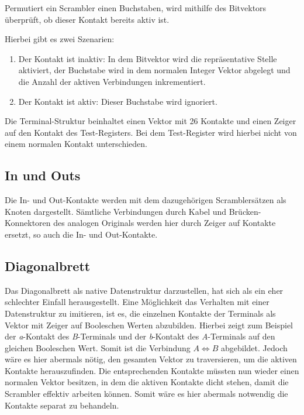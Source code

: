 \noindent


Permutiert ein Scrambler einen Buchstaben, wird mithilfe des Bitvektors überprüft, ob dieser Kontakt bereits aktiv ist.

Hierbei gibt es zwei Szenarien:
\begin{enumerate}
	\item Der Kontakt ist inaktiv: In dem Bitvektor wird die repräsentative Stelle aktiviert, der Buchstabe wird in dem normalen Integer Vektor abgelegt und die Anzahl der aktiven Verbindungen inkrementiert.
	
	\item Der Kontakt ist aktiv: Dieser Buchstabe wird ignoriert. 
\end{enumerate}

Die Terminal-Struktur beinhaltet einen Vektor mit 26 Kontakte und einen Zeiger auf den Kontakt des Test-Registers.
Bei dem Test-Register wird hierbei nicht von einem \glqq normalen\grqq{} Kontakt unterschieden.

\subsection{In und Outs}\label{subsec:impl_in_und_outs}
Die In- und Out-Kontakte werden mit dem dazugehörigen Scramblersätzen als Knoten dargestellt.
Sämtliche Verbindungen durch Kabel und Brücken-Konnektoren des analogen Originals werden hier durch Zeiger auf Kontakte ersetzt, so auch die In- und Out-Kontakte.

\subsection{Diagonalbrett}\label{subsec:impl_diagonal_board}
Das Diagonalbrett als native Datenstruktur darzustellen, hat sich als ein eher schlechter Einfall herausgestellt.
Eine Möglichkeit das Verhalten mit einer Datenstruktur zu imitieren, ist es, die einzelnen Kontakte der Terminals als Vektor mit Zeiger auf Booleschen Werten abzubilden.
Hierbei zeigt zum Beispiel der \emph{a}-Kontakt des \emph{B}-Terminals und der \emph{b}-Kontakt des \emph{A}-Terminals auf den gleichen Booleschen Wert.
Somit ist die Verbindung $A \Leftrightarrow B$ abgebildet.
Jedoch wäre es hier abermals nötig, den gesamten Vektor zu traversieren, um die aktiven Kontakte herauszufinden.
Die entsprechenden Kontakte müssten nun wieder einen normalen Vektor besitzen, in dem die aktiven Kontakte \glqq dicht\grqq{} stehen, damit die Scrambler effektiv arbeiten können.
Somit wäre es hier abermals notwendig die Kontakte separat zu behandeln.

